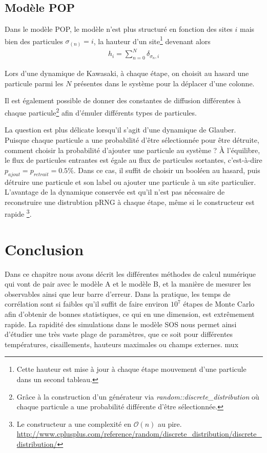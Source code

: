 	\subsection{Modèle POP}		

Dans le modèle POP, le modèle n'est plus structuré en fonction des sites $i$ mais bien des particules $\sigma_(n) = i$, la hauteur d'un site\footnote{Cette hauteur est mise à jour à chaque étape mouvement d'une particule dans un second tableau.} devenant alors
\begin{align}
	h_i = \sum_{n=0}^N \delta_{\sigma_n,i}
\end{align}

Lors d'une dynamique de Kawasaki, à chaque étape, on choisit au hasard une particule parmi les $N$ présentes dans le système pour la déplacer d'une colonne. 

Il est également possible de donner des constantes de diffusion différentes à chaque particule\footnote{Grâce à la construction d'un générateur via \textit{random::discrete\_distribution} où chaque particule a une probabilité différente d'être sélectionnée. }  afin d'émuler différents types de particules. 

La question est plus délicate lorsqu'il s'agit d'une dynamique de Glauber. Puisque chaque particule a une probabilité d'être sélectionnée pour être détruite, comment choisir la probabilité d'ajouter une particule au système ? À l'équilibre, le flux de particules entrantes est égale au flux de particules sortantes, c'est-à-dire $p_{ajout}= p_{retrait} = 0.5\%$. Dans ce cas, il suffit de choisir un booléen au hasard, puis détruire une particule et son label ou ajouter une particule à un site particulier. L'avantage de la dynamique conservée est qu'il n'est pas nécessaire de reconstruire une distrubtion pRNG à chaque étape, même si le constructeur est rapide \footnote{Le constructeur a une complexité en $\mathcal{O}(n)$ au pire. \url{http://www.cplusplus.com/reference/random/discrete_distribution/discrete_distribution/}}.

\section{Conclusion}

Dans ce chapitre nous avons décrit les différentes méthodes de calcul numérique qui vont de pair avec le modèle A et le modèle B, et la manière de mesurer les observables ainsi que leur barre d'erreur. Dans la pratique, les temps de corrélation sont si faibles qu'il suffit de faire environ $10^7$ étapes de Monte Carlo afin d'obtenir de bonnes statistiques, ce qui en une dimension, est extrêmement rapide. La rapidité des simulations dans le modèle SOS nous permet ainsi d'étudier une très vaste plage de paramètres, que ce soit pour différentes températures, cisaillements, hauteurs maximales ou champs externes. 
mux
